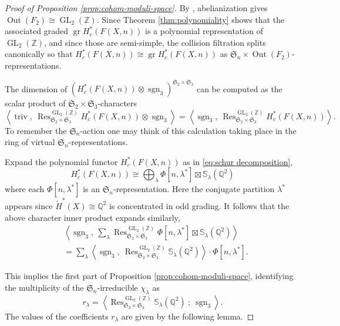 \documentclass[12pt]{article}
\newcommand{\Z}{\mathbb{Z}}
\newcommand{\Q}{\mathbb{Q}}
\newcommand{\SymGroup}[1][n]{\mathfrak{S}_{#1}}
\newcommand{\Specht}[1]{\chi_{#1}}
\newcommand{\TransposePartition}[1]{{#1}^{\ast}}
\newcommand{\Schur}[1]{\mathbb{S}_{#1}}
\newcommand{\sgn}[1][n]{\operatorname{sgn}_{#1}}
\DeclareMathOperator{\GL}{GL}
\DeclareMathOperator{\gr}{gr}
\DeclareMathOperator{\Out}{Out}
\DeclareMathOperator{\Res}{Res}
\theoremstyle{plain}
\theoremstyle{definition}
\theoremstyle{remark}
\begin{document}
\begin{proof}[Proof of Proposition \ref{prop:cohom-moduli-space}]
    By \cite{Nielsen1917}, abelianization gives $\Out(F_2)\cong \GL_2(\Z)$. Since Theorem \ref{thm:polynomiality} shows that the associated graded $\gr H^*_c(F(X,n))$ is a polynomial representation of $\GL_2(\Z)$, and since those are semi-simple, the collision filtration splits canonically so that $H^*_c(F(X,n)) \cong \gr H^*_c(F(X,n))$ as $\SymGroup\times\Out(F_2)$-representations.
    
    The dimension of $(H_c^{\ast}(F(X, n))\otimes \sgn[3])^{\SymGroup[2]\times\SymGroup[3]}$ can be computed as the scalar product of $\SymGroup[2]\times \SymGroup[3]$-characters
    \[
        \left\langle \operatorname{triv}, \ \Res_{\SymGroup[2]\times\SymGroup[3]}^{\GL_2(\Z)}{H_c^{\ast}(F(X, n))}\otimes \sgn[3]\right\rangle = \left\langle \sgn[3], \ \Res_{\SymGroup[2]\times\SymGroup[3]}^{\GL_2(\Z)}{H_c^{\ast}(F(X, n))}\right\rangle.
    \]
    To remember the $\SymGroup$-action one may think of this calculation taking place in the ring of virtual $\SymGroup[n]$-representations.

    Expand the polynomial functor $H^*_c(F(X,n))$ as in \eqref{eq:schur decomposition},
    \[
    H^*_c(F(X,n)) \cong \bigoplus_{\lambda} \Phi[n,\TransposePartition{\lambda}] \boxtimes \Schur{{\lambda}}(\Q^2)
    \]
    where each $\Phi[n,\TransposePartition{\lambda}]$ is an $\SymGroup$-representation. Here the conjugate partition $\TransposePartition{\lambda}$ appears since $\tilde{H}^*(X)\cong \Q^2$ is concentrated in odd grading.
    It follows that the above character inner product expands similarly,
    \begin{equation}
    \begin{split}
         &\left\langle  \sgn[3] , \ \sum_{\lambda}\Res_{\SymGroup[2]\times\SymGroup[3]}^{\GL_2(\Z)}{\Phi[n, \TransposePartition{\lambda}] 
         \boxtimes \Schur{{\lambda}}(\Q^2)} \right\rangle \\ & = \sum_{\lambda}\left\langle  \sgn[3], \ \Res_{\SymGroup[2]\times\SymGroup[3]}^{\GL_2(\Z)}{\Schur{{\lambda}}(\Q^2)}\right\rangle \cdot \Phi[n,\TransposePartition{\lambda}].
            \end{split}
    \end{equation}
    
    This implies the first part of Proposition \ref{prop:cohom-moduli-space}, identifying the multiplicity of the $\SymGroup$-irreducible $\Specht{\lambda}$ as
    \begin{equation}\label{value-a-lambda}
        r_{\lambda} = \left\langle  \Res_{\SymGroup[2]\times\SymGroup[3]}^{\GL_2(\Z)}{\Schur{\lambda}(\Q^2)} \ ;\ \sgn[3] \right\rangle. 
    \end{equation}
The values of the coefficients $r_\lambda$ are given by the following lemma.
\end{proof}
\end{document}
